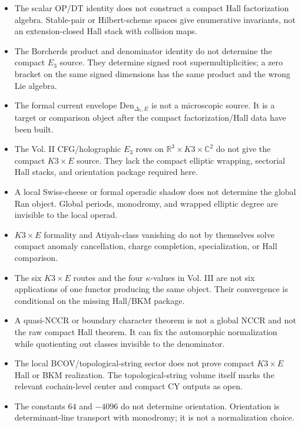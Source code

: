 \begin{itemize}
\item The scalar OP/DT identity does not construct a compact Hall
factorization algebra.  Stable-pair or Hilbert-scheme spaces give
enumerative invariants, not an extension-closed Hall stack with
collision maps.

\item The Borcherds product and denominator identity do not determine
the compact \(E_3\) source.  They determine signed root
supermultiplicities; a zero bracket on the same signed dimensions has
the same product and the wrong Lie algebra.

\item The formal current envelope \(\mathrm{Den}_{\Delta_5,E}\) is not a
microscopic source.  It is a target or comparison object after the
compact factorization/Hall data have been built.

\item The Vol. II CFG/holographic \(E_3\) rows on
\(\mathbb R^3\times K3\times\mathbb C^2\) do not give the compact
\(K3\times E\) source.  They lack the compact elliptic wrapping,
sectorial Hall stacks, and orientation package required here.

\item A local Swiss-cheese or formal operadic shadow does not determine
the global Ran object.  Global periods, monodromy, and wrapped elliptic
degree are invisible to the local operad.

\item \(K3\times E\) formality and Atiyah-class vanishing do not by
themselves solve compact anomaly cancellation, charge completion,
specialization, or Hall comparison.

\item The six \(K3\times E\) routes and the four \(\kappa\)-values in
Vol. III are not six applications of one functor producing the same
object.  Their convergence is conditional on the missing Hall/BKM
package.

\item A quasi-NCCR or boundary character theorem is not a global NCCR
and not the raw compact Hall theorem.  It can fix the automorphic
normalization while quotienting out classes invisible to the
denominator.

\item The local BCOV/topological-string sector does not prove compact
\(K3\times E\) Hall or BKM realization.  The topological-string volume
itself marks the relevant cochain-level center and compact CY outputs as
open.

\item The constants \(64\) and \(-4096\) do not determine orientation.
Orientation is determinant-line transport with monodromy; it is not a
normalization choice.
\end{itemize}


